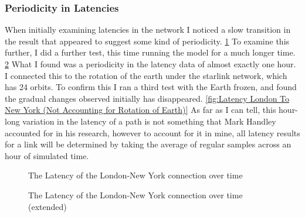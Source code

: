 \documentclass[12pt]{article}
\begin{document}
\subsubsection{Periodicity in Latencies}

When initially examining latencies in the network I noticed a slow transition in the result that appeared to suggest some kind of periodicity. \ref{fig:Latency London To New York} To examine this further, I did a further test, this time running the model for a much longer time. \ref{fig:Latency London To New York Extended} What I found was a periodicity in the latency data of almost exactly one hour. I connected this to the rotation of the earth under the starlink network, which has 24 orbits. To confirm this I ran a third test with the Earth frozen, and found the gradual changes observed initially has disappeared. \ref{fig:Latency London To New York (Not Accounting for Rotation of Earth)} As far as I can tell, this hour-long variation in the latency of a path is not something that Mark Handley accounted for in his research, however to account for it in mine, all latency results for a link will be determined by taking the average of regular samples across an hour of simulated time.

\begin{figure}
\label{fig:Latency London To New York}
\caption{The Latency of the London-New York connection over time}
\end{figure}

\begin{figure}
\label{fig:Latency London To New York Extended}
\caption{The Latency of the London-New York connection over time (extended)}
\end{figure}
\end{document}

